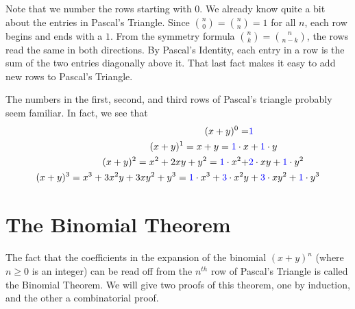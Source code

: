Note that we number the rows starting with $0$.
We already know quite a bit about the entries in Pascal's Triangle. Since $\displaystyle {n\choose 0} 
={n\choose n} = 1$ for all $n$, each row begins and ends with a $1$. From the symmetry
formula $\displaystyle {n\choose k} = {n\choose {n-k}}$, the rows read the same in  both directions.
By Pascal's Identity, each entry in a row is the sum of the two entries diagonally above it.
That last fact makes it easy to add new rows to Pascal's Triangle.

The numbers in the first, second, and third rows of Pascal's triangle probably seem familiar.
 In fact, we see that %
\begin{align*}
 (x+y)^0 = &{\color{blue}1}\\
 (x+y)^1 = x+y = {\color{blue}1}\cdot x &+{\color{blue}1}\cdot y\\
 (x+y)^2 = x^2+2xy +y^2 = {\color{blue}1}\cdot x^2 + &{\color{blue}2}\cdot xy + {\color{blue}1}\cdot y^2\\
 (x+y)^3 = x^3 + 3x^2y + 3xy^2 + y^3 = 
  {\color{blue}1}\cdot x^3 + {\color{blue}3}\cdot x^2y &+ {\color{blue}3}\cdot xy^2 + {\color{blue}1}\cdot y^3\\
\end{align*}


\section{The Binomial Theorem}
The fact that the coefficients in the expansion of the binomial $(x+y)^n$ (where $n\geq 0$ is 
an integer) can be read off from the $n^{th}$ row of Pascal's Triangle is called the
Binomial Theorem. We will give two proofs of this theorem, one by induction, and the
other a combinatorial proof. 

